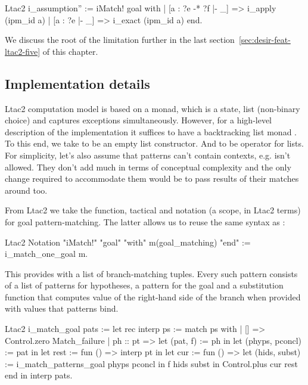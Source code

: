 \begin{itemize}
\begin{minipage}{\linewidth}
\begin{coq}
Ltac2 i_assumption'' :=
  iMatch! goal with
  | [a : ?e -* ?f |- _] => i_apply (ipm_id a)
  | [a : ?e |- _] => i_exact (ipm_id a)
  end.
\end{coq}
\end{minipage}

We discuss the root of the limitation further in the last section~\ref{sec:desir-feat-ltac2-five} of this chapter.
\end{itemize}

\subsection{Implementation details}
\label{subsec:implementation_details}

Ltac2 computation model is based on a monad, which is a state, list (non-binary choice) and captures exceptions simultaneously.
However, for a high-level description of the implementation it suffices to have a backtracking list monad .
To this end, we take  to be an empty list constructor.
And  to be  operator for lists.
For simplicity, let's also assume that patterns can't contain contexts, e.g.  isn't allowed.
They don't add much in terms of conceptual complexity and the only change required to accommodate them would be to pass results of their matches around too.

From Ltac2 we take the  function,  tactical and notation (a scope, in Ltac2 terms) for goal pattern-matching.
The latter allows us to reuse the same syntax as :
\begin{coq}
Ltac2 Notation "iMatch!" "goal" "with" m(goal_matching) "end" :=
  i_match_one_goal m.
\end{coq}
This provides  with a list of branch-matching tuples.
Every such pattern consists of a list of patterns for hypotheses, a pattern for the goal and a substitution function that computes value of the right-hand side of the branch when provided with values that patterns bind.

\begin{coq}
Ltac2 i_match_goal pats :=
  let rec interp ps := match ps with
  | [] => Control.zero Match_failure
  | ph :: pt =>
    let (pat, f) := ph in
    let (phyps, pconcl) := pat in
    let rest := fun () => interp pt in
    let cur := fun () =>
      let (hids, subst) := i_match_patterns_goal phyps pconcl in
      f hids subst
    in Control.plus cur rest
  end in
  interp pats.
\end{coq}

